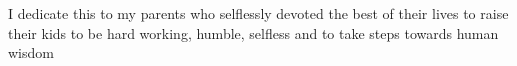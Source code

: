 \addvspace{4.25in}
\begin{center}\singlespacing
I dedicate this to my parents who selflessly devoted the best of their lives to raise their kids to be hard working, humble, selfless and to take steps towards human wisdom\\
\end{center}
